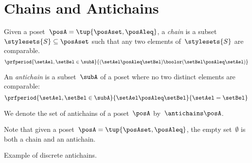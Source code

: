 
\section{Chains and Antichains}
\label{sec:chains-antichains}
\begin{definition}
	\label{def:chain}
	Given a poset~$\posA = \tup{\posAset, \posAleq}$, a \emph{chain} is a subset~$\stylesets{S} \subseteq \posAset$ such that any two elements of~$\stylesets{S}$ are comparable.
	\begin{equation}
		\prfperiod{
			\setAel,\setBel \in \subA
		}{
			(\setAel \posAleq  \setBel) \boolor (\setBel \posAleq  \setAel)
		}
	\end{equation}
\end{definition}

\begin{definition}
	\label{def:antichain}
	An \emph{antichain} is a subset~$\subA$ of a poset where no two distinct elements are comparable:
	\begin{equation}
		\prfperiod{
			\setAel,\setBel \in \subA
		}{
			\setAel \posAleq \setBel
		}{
			\setAel = \setBel
		}
	\end{equation}
\end{definition}

We denote the set of antichains of a poset~$\posA$ by~$\antichains\posA$.

\begin{remark}
	Note that given a poset~$\posA=\tup{\posAset,\posAleq}$, the empty set~$\emptyset$ is both a chain and an antichain.
\end{remark}

\begin{marginfigure}
	\centering
	\caption{Example of discrete antichains.}
	\label{fig:antichain}
\end{marginfigure}

